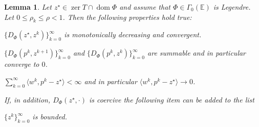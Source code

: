 \documentclass[11pt,onecolumn]{article}
\DeclareMathOperator{\dom}{dom}
\DeclareMathOperator{\zer}{zer}
\newtheorem{lemma}[lemma]{Lemma}
\theoremstyle{remark}
\begin{document}
\begin{lemma}
\label{thm:fejer_prox_solodov_implications}
Let $z^\star \in \zer T \cap \dom \Phi$ and assume that $\Phi\in \Gamma_0(\mathbb{E})$ is Legendre. Let $0\leq \rho_k \leq \rho < 1$. Then the following properties hold true:
\begin{lemenum}
\item \label{thm:fejer_prox_solodov_implications:decr} $\{D_\Phi(z^\star,z^{k})\}_{k=0}^\infty$ is monotonically decreasing and convergent.
\item \label{thm:fejer_prox_solodov_implications:sum} $\{D_\Phi(p^{k},z^{k+1})\}_{k=0}^\infty$ and $\{D_\Phi(p^{k},z^{k})\}_{k=0}^\infty$ are summable and in particular converge to $0$.
\item \label{thm:fejer_prox_solodov_implications:sum_inner} $\sum_{k=0}^\infty \langle w^{k}, p^{k}-z^\star \rangle < \infty$ and in particular $\langle w^{k}, p^{k}-z^\star \rangle \to 0$.
\end{lemenum}
If, in addition, $D_\Phi(z^\star, \cdot)$ is coercive the following item can be added to the list
\begin{lemenum}[resume]
\item \label{thm:fejer_prox_solodov_implications:bounded} $\{z^{k}\}_{k=0}^\infty$ %
is bounded.
\end{lemenum}
\end{lemma}
\end{document}
